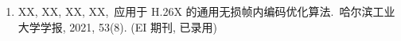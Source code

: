 \begin{publications}
    \begin{enumerate}
        \item XX, XX, XX, XX,\,
              应用于 H.26X 的通用无损帧内编码优化算法.\,
              哈尔滨工业大学学报, 2021, 53(8). (EI 期刊, 已录用)

    \end{enumerate}


\end{publications}